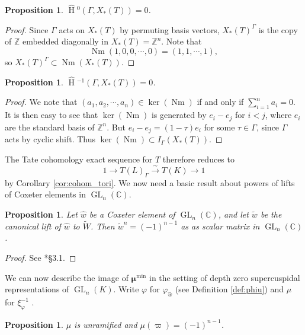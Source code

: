 \documentclass{mrlart7}
\theoremstyle{plain}
\newtheorem{proposition}[theorem]{Proposition}
\newcommand{\HT}[1]{\hat{\HH}{}^{#1}}
\theoremstyle{definition}
\numberwithin{equation}{section}
\DeclareMathOperator{\HH}{H}
\DeclareMathOperator{\Nm}{Nm}
\DeclareMathOperator{\GL}{GL}
\newcommand{\CC}{\mathbb{C}}
\newcommand{\ZZ}{\mathbb{Z}}
\newcommand{\bmu}{\boldsymbol\mu}
\newcommand{\mumin}{\bmu^{\min}}
\begin{document}
\begin{proposition}
$\HT{0}(\Gamma, X_*(T)) = 0$.
\end{proposition}

\begin{proof}
Since $\Gamma$ acts on $X_*(T)$ by permuting basis vectors,
$X_*(T)^{\Gamma}$ is the copy of $\ZZ$ embedded diagonally in
$X_*(T) = \mathbb{Z}^n$.  Note that $$\Nm(1,0,0,\cdots,0) = (1,1,\cdots,1),$$ so
$X_*(T)^{\Gamma} \subset \Nm(X_*(T))$.
\end{proof}

\begin{proposition}
$\HT{-1}(\Gamma, X_*(T)) = 0$.
\end{proposition}

\begin{proof}
We note that $(a_1, a_2, \cdots, a_n) \in \ker(\Nm)$ if and only if $\sum_{i=1}^n a_i = 0$.
It is then easy to see that $\ker(\Nm)$ is generated by $e_i - e_j$ for $i < j$, where
$e_i$ are the standard basis of $\mathbb{Z}^n$.  But $e_i - e_j = (1 - \tau)e_i$ for some
$\tau \in \Gamma$, since $\Gamma$ acts by cyclic shift.  Thus $\ker(\Nm) \subset I_{\Gamma}(X_*(T))$.
\end{proof}

The Tate cohomology exact sequence for $T$ therefore reduces to
$$1 \rightarrow T(L)_{\Gamma} \xrightarrow{\sim} T(K) \rightarrow 1$$ by
Corollary \ref{cor:cohom_tori}.  We now need a basic result about powers of lifts
of Coxeter elements in $\GL_{n}(\CC)$.

\begin{proposition}\label{prop:powers_of_lifts}
Let $\hat{w}$ be a Coxeter element of $\GL_{n}(\CC)$, and let $\tilde{w}$ be the
canonical lift of $\hat{w}$ to $\widetilde{W}$. Then $\tilde{w}^n = (-1)^{n-1}$ as
as scalar matrix in $\GL_{n}(\CC)$.
\end{proposition}

\begin{proof}
See \cite{zaremsky:ppa}*{\S3.1}.
\end{proof}

We can now describe the image of $\mumin$ in the setting of
depth zero supercuspidal representations of $\GL_{n}(K)$.  Write
$\varphi$ for $\varphi_{\hat{w}}$ (see Definition \ref{def:phiu}) and $\mu$ for $\xi_{\varphi}^{-1}$ .

\begin{proposition} \label{prop:rectifier_agreement}
$\mu$ is unramified and
$\mu(\varpi) = (-1)^{n-1}$.
\end{proposition}
\end{document}
